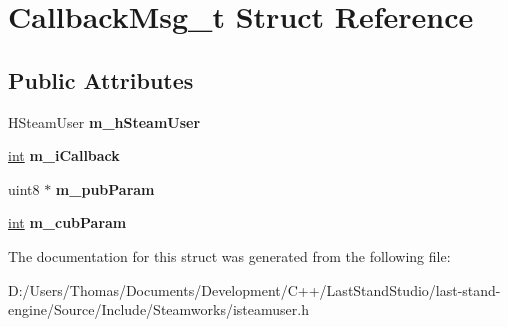 \hypertarget{structCallbackMsg__t}{}\section{Callback\+Msg\+\_\+t Struct Reference}
\label{structCallbackMsg__t}
\subsection*{Public Attributes}
\begin{DoxyCompactItemize}
\item 
\hypertarget{structCallbackMsg__t_ab0b8148265fb6a3ee2ed91b0c1201af5}{}H\+Steam\+User {\bfseries m\+\_\+h\+Steam\+User}\label{structCallbackMsg__t_ab0b8148265fb6a3ee2ed91b0c1201af5}

\item 
\hypertarget{structCallbackMsg__t_a5504d33c9e201ac4755e86b0ed8150d7}{}\hyperlink{SDL__thread_8h_a6a64f9be4433e4de6e2f2f548cf3c08e}{int} {\bfseries m\+\_\+i\+Callback}\label{structCallbackMsg__t_a5504d33c9e201ac4755e86b0ed8150d7}

\item 
\hypertarget{structCallbackMsg__t_a032b658e0d5020c2e66ba8143e8277f5}{}uint8 $\ast$ {\bfseries m\+\_\+pub\+Param}\label{structCallbackMsg__t_a032b658e0d5020c2e66ba8143e8277f5}

\item 
\hypertarget{structCallbackMsg__t_a82532812531e06f166e38cc0024a74ff}{}\hyperlink{SDL__thread_8h_a6a64f9be4433e4de6e2f2f548cf3c08e}{int} {\bfseries m\+\_\+cub\+Param}\label{structCallbackMsg__t_a82532812531e06f166e38cc0024a74ff}

\end{DoxyCompactItemize}


The documentation for this struct was generated from the following file\+:\begin{DoxyCompactItemize}
\item 
D\+:/\+Users/\+Thomas/\+Documents/\+Development/\+C++/\+Last\+Stand\+Studio/last-\/stand-\/engine/\+Source/\+Include/\+Steamworks/isteamuser.\+h\end{DoxyCompactItemize}
